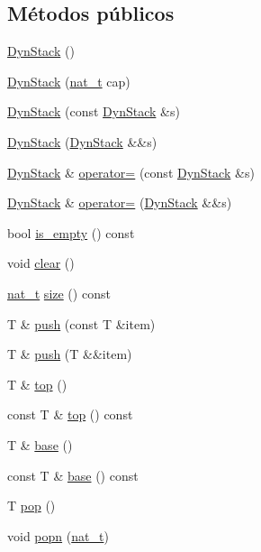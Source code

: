 \subsection*{Métodos públicos}
\begin{DoxyCompactItemize}
\item 
\hyperlink{class_designar_1_1_dyn_stack_a974a328c42eeb04114249c321a7d2ebe}{Dyn\+Stack} ()
\item 
\hyperlink{class_designar_1_1_dyn_stack_afe8f19b00f9c0cb21ea2d64fedadcb5e}{Dyn\+Stack} (\hyperlink{namespace_designar_aa72662848b9f4815e7bf31a7cf3e33d1}{nat\+\_\+t} cap)
\item 
\hyperlink{class_designar_1_1_dyn_stack_a4a28588893016f554cd8ea21b37e2c5f}{Dyn\+Stack} (const \hyperlink{class_designar_1_1_dyn_stack}{Dyn\+Stack} \&s)
\item 
\hyperlink{class_designar_1_1_dyn_stack_a8a15a70c98b19554d73037118fa8eed9}{Dyn\+Stack} (\hyperlink{class_designar_1_1_dyn_stack}{Dyn\+Stack} \&\&s)
\item 
\hyperlink{class_designar_1_1_dyn_stack}{Dyn\+Stack} \& \hyperlink{class_designar_1_1_dyn_stack_a95c3464bba2e4c2393ada749ab4d9248}{operator=} (const \hyperlink{class_designar_1_1_dyn_stack}{Dyn\+Stack} \&s)
\item 
\hyperlink{class_designar_1_1_dyn_stack}{Dyn\+Stack} \& \hyperlink{class_designar_1_1_dyn_stack_aa5b875ca2b2a6ce501a91c79d5857166}{operator=} (\hyperlink{class_designar_1_1_dyn_stack}{Dyn\+Stack} \&\&s)
\item 
bool \hyperlink{class_designar_1_1_dyn_stack_ae0c03ed9771729e3773128868fb7afe5}{is\+\_\+empty} () const
\item 
void \hyperlink{class_designar_1_1_dyn_stack_aab024478a38633aeb3d79e2ddcbd1958}{clear} ()
\item 
\hyperlink{namespace_designar_aa72662848b9f4815e7bf31a7cf3e33d1}{nat\+\_\+t} \hyperlink{class_designar_1_1_dyn_stack_a4c15622a5283c072287a7dfdd6c4bd2d}{size} () const
\item 
T \& \hyperlink{class_designar_1_1_dyn_stack_a07d7d76d087e7b9dc287a7b2acd02fc6}{push} (const T \&item)
\item 
T \& \hyperlink{class_designar_1_1_dyn_stack_a1eff6c891fd3800c6aa55f35e14e4f88}{push} (T \&\&item)
\item 
T \& \hyperlink{class_designar_1_1_dyn_stack_a33e8c623bae518ed88cdee01602febb0}{top} ()
\item 
const T \& \hyperlink{class_designar_1_1_dyn_stack_a497eb06d2cb8280d031586a913b1317c}{top} () const
\item 
T \& \hyperlink{class_designar_1_1_dyn_stack_aa07528cd0ef77519ca5b5694bed9695d}{base} ()
\item 
const T \& \hyperlink{class_designar_1_1_dyn_stack_affe0e56802ac0c982f598e2155bf4a46}{base} () const
\item 
T \hyperlink{class_designar_1_1_dyn_stack_ac3e7235449ffb9fc0ac96ba0b081d2ed}{pop} ()
\item 
void \hyperlink{class_designar_1_1_dyn_stack_a161b319e52448a4f824b036a9f7c6cca}{popn} (\hyperlink{namespace_designar_aa72662848b9f4815e7bf31a7cf3e33d1}{nat\+\_\+t})
\end{DoxyCompactItemize}



